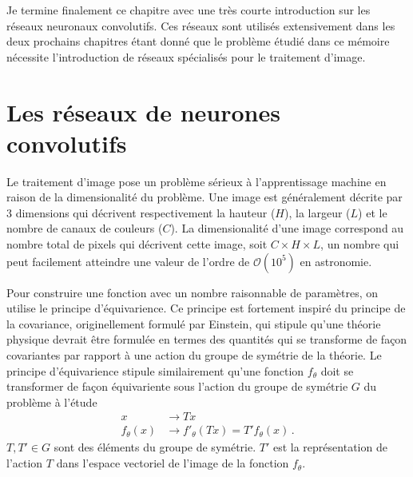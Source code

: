 Je termine finalement ce chapitre avec une très courte introduction sur les réseaux neuronaux convolutifs. Ces réseaux sont utilisés 
extensivement dans les deux prochains chapitres étant donné que le problème étudié dans ce mémoire nécessite l'introduction de réseaux 
spécialisés pour le traitement d'image. 

\section{Les réseaux de neurones convolutifs}\label{sec:cnn}
Le traitement d'image pose un problème sérieux à l'apprentissage machine en raison de la dimensionalité du problème. 
Une image est généralement décrite par 3 dimensions qui décrivent respectivement la hauteur ($H$), la largeur ($L$) et le nombre de canaux de couleurs ($C$). 
La dimensionalité d'une image correspond au nombre total de pixels qui décrivent cette image, soit $C \times H \times L $, 
un nombre qui peut facilement atteindre une valeur de l'ordre de $\mathcal{O}(10^{5})$ en astronomie.

Pour construire une fonction avec un nombre raisonnable de paramètres, on utilise le principe d'équivarience. 
Ce principe est fortement inspiré du principe de la covariance, originellement formulé 
par Einstein, qui stipule qu'une théorie physique devrait être formulée en termes des quantités qui se transforme de façon covariantes 
par rapport à une action du groupe de symétrie de la théorie. Le principe d'équivarience stipule similairement qu'une fonction $f_\theta$ doit se transformer de façon équivariente
sous l'action du groupe de symétrie $G$ du problème à l'étude
\begin{equation}
        \begin{split}
                x &\rightarrow Tx\\
                f_\theta(x) &\rightarrow f'_\theta(Tx) = T'f_\theta(x) \, .
        \end{split}
\end{equation} 
$T, T' \in G$ sont des éléments du groupe de symétrie. $T'$ est la représentation de l'action $T$ dans l'espace vectoriel de l'image de la fonction $f_\theta$.

